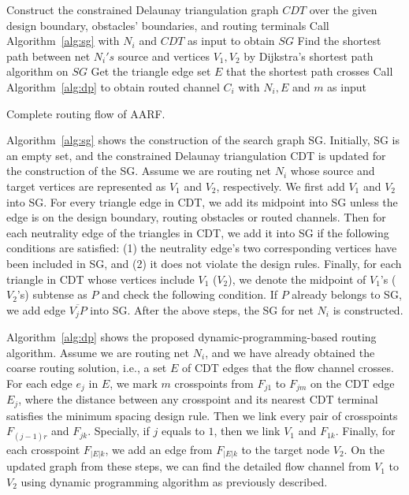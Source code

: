 \documentclass[journal]{IEEEtran}
\begin{document}
\begin{algorithm2e}[h]
\small
{}
Construct the constrained Delaunay triangulation graph $CDT$ over the given 
design boundary, obstacles' boundaries, and routing terminals\;
{
	Call Algorithm~\ref{alg:sg} with $N_i$ and $CDT$ as input to obtain $SG$\;
	Find the shortest path between net $N_i's$ source and vertices $V_1, V_2$ by Dijkstra's shortest path algorithm on $SG$\;
	Get the triangle edge set $E$ that the shortest path crosses\;
	Call Algorithm~\ref{alg:dp} to obtain routed channel $C_i$ with $N_i, E$ and $m$ as input\;
}
\caption{Complete routing flow of AARF.}
\label{alg:aarf}
\end{algorithm2e}

Algorithm~\ref{alg:sg} shows the construction of the search graph SG. 
Initially, SG is an empty set, and the constrained Delaunay triangulation CDT is updated for the construction of the SG. 
Assume we are routing net $N_i$ whose source and target vertices are represented as $V_1$ and $V_2$, respectively.
We first add $V_1$ and $V_2$ into SG. 
For every triangle edge in CDT, we add its midpoint into SG unless the edge is on the design boundary, routing obstacles or routed channels. 
Then for each neutrality edge of the triangles in CDT, we add it into SG if the following conditions are satisfied: (1) the neutrality edge's two corresponding vertices have been included in SG, and (2) it does not violate the design rules. 
Finally, for each triangle in CDT whose vertices include $V_1$ ($V_2$), we denote the midpoint of $V_1$'s ($V_2$'s) subtense as $P$ and check the following condition. 
If $P$ already belongs to SG, we add edge $\overline{V_jP}$ into SG. 
After the above steps, the SG for net $N_i$ is constructed. 

Algorithm~\ref{alg:dp} shows the proposed dynamic-programming-based routing algorithm. 
Assume we are routing net $N_i$, and we have already obtained the coarse routing solution, i.e., a set $E$ of CDT edges that the flow channel crosses. 
For each edge $e_j$ in $E$, we mark $m$ crosspoints from $F_{j1}$ to $F_{jm}$ on the CDT edge $E_j$, where the distance between any crosspoint and its nearest CDT terminal satisfies the minimum spacing design rule. 
Then we link every pair of crosspoints $F_{(j-1)r}$ and $F_{jk}$. Specially, if $j$ equals to $1$, then we link $V_1$ and $F_{1k}$. 
Finally, for each crosspoint $F_{|E|k}$, we add an edge from $F_{|E|k}$ to the target node $V_2$. On the updated graph from these steps, we can find the detailed flow channel from $V_1$ to $V_2$ using dynamic programming algorithm as previously described.
\end{document}
